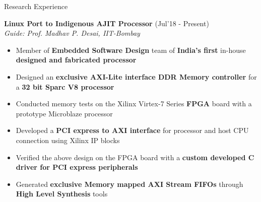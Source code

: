 \documentclass{resume}
\newcommand{\sepval}{-0.5em}
\begin{document}
\begin{rSection}{Research Experience}

\vspace{-0.4cm}

\item {\bf{Linux Port to Indigenous AJIT Processor}} \hfill{(Jul'18 - Present)}\\

\emph{Guide: Prof. Madhav P. Desai, IIT-Bombay}\\ 
[-0.2cm]

\begin{itemize}[leftmargin=*]
		
	\itemsep \sepval


	\item Member of {\bf Embedded Software Design} team of {\bf India's first} in-house {\bf designed and fabricated processor}

	\item Designed an {\bf exclusive AXI-Lite interface DDR Memory controller} for a {\bf 32 bit Sparc V8 processor} 
	
	\item Conducted memory tests on the Xilinx Virtex-7 Series {\bf FPGA} board with a prototype Microblaze processor
	
	\item Developed a {\bf PCI express to AXI interface} for processor and host CPU connection using Xilinx IP blocks
	     
	\item Verified the above design on the FPGA board with a {\bf custom developed C driver for PCI express peripherals}

	\item Generated {\bf exclusive Memory mapped AXI Stream FIFOs} through {\bf High Level Synthesis} tools

\end{itemize}

\end{rSection}
\end{document}
